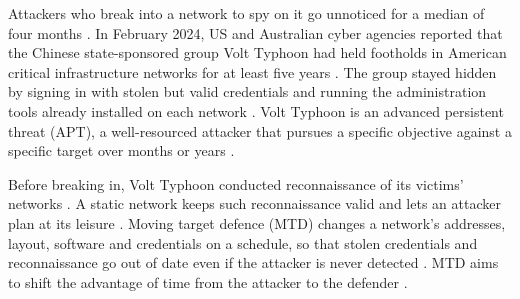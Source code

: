 \documentclass{cshonours}
\begin{document}
Attackers who break into a network to spy on it go unnoticed for a
median of four months \citep{mtrends2026}. In February 2024, US and
Australian cyber agencies reported that the Chinese state-sponsored
group Volt Typhoon had held footholds in American critical
infrastructure networks for at least five years \citep{cisaaa24038a}.
The group stayed hidden by signing in with stolen but valid credentials
and running the administration tools already installed on each network
\citep{cisaaa24038a}. Volt Typhoon is an advanced persistent threat
(APT), a well-resourced attacker that pursues a specific objective
against a specific target over months or years \citep{alshamrani2019}.

Before breaking in, Volt Typhoon conducted reconnaissance of its victims'
networks \citep{cisaaa24038a}. A static network keeps such reconnaissance
valid and lets an attacker plan at its leisure \citep{ghosh2009nitrd}. Moving target defence (MTD) changes a network's
addresses, layout, software and credentials on a schedule, so that stolen
credentials and reconnaissance go out of date even if the attacker is
never detected \citep{cho2020, brown2023}. MTD aims to shift the advantage of time
from the attacker to the defender \citep{ghosh2009nitrd, zhuang2012}.
\end{document}
